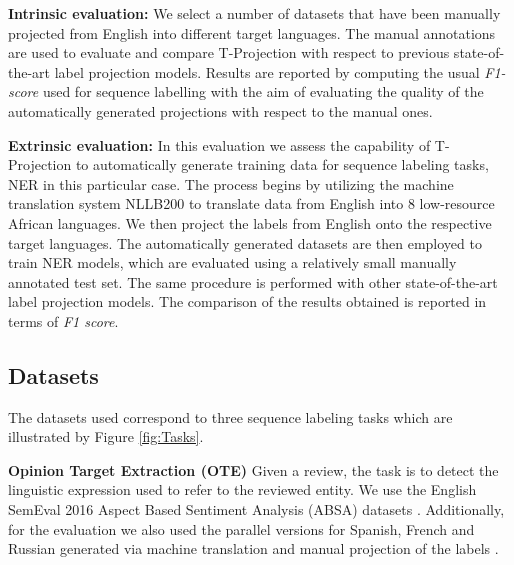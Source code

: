 \documentclass[11pt]{article}
\begin{document}
\textbf{Intrinsic evaluation:} We select a number of datasets that have been manually projected from English into different target languages. The manual annotations are used to evaluate and compare T-Projection with respect to previous state-of-the-art label projection models. Results are reported by computing the usual \emph{F1-score} used for sequence labelling \cite{tjong-kim-sang-de-meulder-2003-introduction} with the aim of evaluating the quality of the automatically generated projections with respect to the manual ones. 

\textbf{Extrinsic evaluation:} In this evaluation we assess the capability of T-Projection to automatically generate training data for sequence labeling tasks, NER in this particular case. The process begins by utilizing the machine translation system NLLB200 \cite{DBLP:journals/corr/abs-2207-04672} to translate data from English into 8 low-resource African languages. We then project the labels from English onto the respective target languages. The automatically generated datasets are then employed to train NER models, which are evaluated using a relatively small manually annotated test set. The same procedure is performed with other state-of-the-art label projection models. The comparison of the results obtained is reported in terms of \textit{F1 score}.

\subsection{Datasets}\label{sec:datasets}
The datasets used correspond to three sequence labeling tasks which are illustrated by Figure \ref{fig:Tasks}.


\label{char:Tasks.OTE}
















\textbf{Opinion Target Extraction (OTE)} Given a review, the task is to detect
the linguistic expression used to refer to the reviewed entity. We use the
English SemEval 2016 Aspect Based Sentiment Analysis (ABSA) datasets
\cite{pontiki-etal-2016-semeval}. Additionally, for the evaluation we also used the
parallel versions for Spanish, French and Russian generated
via machine translation and manual projection of the labels
\cite{garcia-ferrero-etal-2022-model}.
\end{document}
